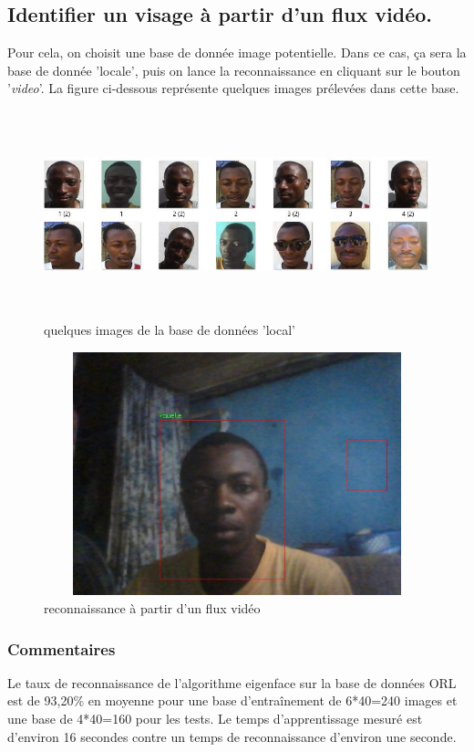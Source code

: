 			\subsection{Identifier un visage à partir d'un flux vidéo.}
			
			Pour cela, on choisit une base de donnée image potentielle. Dans ce cas, ça sera la base de donnée 'locale', puis on lance la reconnaissance en cliquant sur le bouton '\textit{video}'. La figure ci-dessous représente quelques images prélevées dans cette base.
			
			\begin{figure}[htbp]
				\centering
					\includegraphics[width=450pt,height=170pt]{bdlocal.JPG}
				\caption{quelques images de la base de données 'local'}
				\label{fig:bdlocal}
			\end{figure}
					
			\begin{figure}[htbp]
				\centering
					\includegraphics[width=350pt,height=200pt]{reconVideo.JPG}
				\caption{reconnaissance à partir d'un flux vidéo}
				\label{fig:reconVideo}
			\end{figure}
			
\newpage
	\subsubsection{Commentaires}
	Le taux de reconnaissance de l'algorithme eigenface sur la base de données ORL est de 93,20\% en moyenne pour une base d'entraînement de 6*40=240 images et une base de 4*40=160 pour les tests. Le temps d'apprentissage mesuré est d'environ 16 secondes contre un temps de reconnaissance d'environ une seconde. 
	
